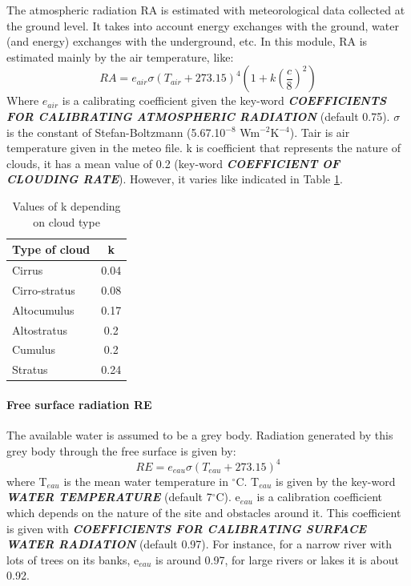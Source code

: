  The atmospheric radiation RA is estimated with meteorological data collected at the ground level. It takes into account energy exchanges with the ground, water (and energy) exchanges with the underground, etc. In this module, RA is estimated mainly by the air temperature, like:
\begin{equation*}
RA=e_{air}\sigma\left(T_{air}+273.15 \right)^4\left(1+k\left(\frac{c}{8}\right)^2 \right)
\end{equation*}
 Where $e_{air}$ is a calibrating coefficient given the key-word \textbf{\textit{COEFFICIENTS FOR CALIBRATING ATMOSPHERIC RADIATION} }(default 0.75). $\sigma$ is the constant of Stefan-Boltzmann (5.67.10${}^{-8}$ Wm${}^{-2}$K${}^{-4}$). Tair is air temperature given in the meteo file. k is coefficient that represents the nature of clouds, it has a mean value of 0.2 (key-word \textbf{\textit{COEFFICIENT OF CLOUDING RATE}}). However, it varies like indicated in Table \ref{tab:kcloud}.
\begin{table}
  \centering
  \begin{tabular}{|l|c|}
     \hline 
     Type of cloud & k \\
     \hline \hline
     Cirrus & 0.04 \\
     Cirro-stratus & 0.08 \\
     Altocumulus & 0.17 \\
     Altostratus & 0.2 \\
     Cumulus & 0.2 \\
     Stratus & 0.24\\
     \hline 
   \end{tabular}
  \caption{Values of k depending on cloud type}\label{tab:kcloud}
\end{table}



\paragraph{  Free surface radiation RE}

 The available water is assumed to be a grey body. Radiation generated by this grey body through the free surface is given by:
\begin{equation*}
RE=e_{eau}\sigma\left(T_{eau}+273.15 \right)^4
\end{equation*}
where T${}_{eau}$ is the mean water temperature in ${}^\circ$C. T${}_{eau}$ is given by the key-word \textbf{\textit{WATER TEMPERATURE}} (default 7${}^\circ$C). e${}_{eau}$ is a calibration coefficient which depends on the nature of the site and obstacles around it. This coefficient is given with \textbf{\textit{COEFFICIENTS FOR CALIBRATING SURFACE WATER RADIATION}} (default 0.97). For instance, for a narrow river with lots of trees on its banks, e${}_{eau}$ is around 0.97, for large rivers or lakes it is about 0.92.


